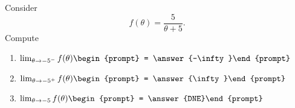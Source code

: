 \documentclass{ximera}
\author{Bart Snapp}
\begin{document}
\begin{exercise}
Consider 
\[
f(\theta) = \frac{5}{\theta +5}.
\]
Compute
\begin{enumerate}
\item $\lim_{\theta\to -5^- } f(\theta) \begin{prompt} = \answer{-\infty}\end{prompt}$
\item $\lim_{\theta\to -5^+ } f(\theta) \begin{prompt} = \answer{\infty}\end{prompt}$
\item $\lim_{\theta\to -5 } f(\theta) \begin{prompt} = \answer{DNE}\end{prompt}$
\end{enumerate}
\end{exercise}
\end{document}
